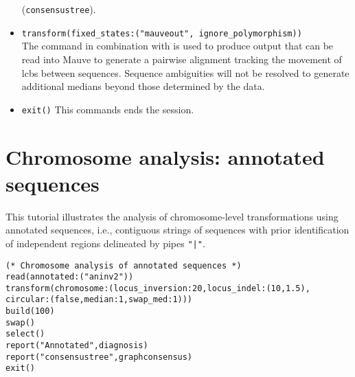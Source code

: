 \begin{itemize}
(\texttt{consensustree}). 
\item \texttt{transform(fixed\_states:("mauveout", ignore\_polymorphism))}  \\The {} command 
in combination with  is used to produce output that 
can be read into Mauve to generate a pairwise alignment tracking the movement of lcbs between sequences. 
Sequence ambiguities will not be resolved to generate additional medians beyond those determined by the data.
\item \texttt{exit()} This commands ends the \poy session.
\end{itemize}


\section{Chromosome analysis: annotated sequences}{\label{tutorial9}}

This tutorial illustrates the analysis of chromosome-level transformations using 
annotated sequences, i.e., contiguous strings of sequences with prior 
identification of independent regions delineated by pipes  \texttt{"|"}. 

\begin{verbatim}
(* Chromosome analysis of annotated sequences *)
read(annotated:("aninv2"))
transform(chromosome:(locus_inversion:20,locus_indel:(10,1.5),
circular:(false,median:1,swap_med:1)))
build(100)
swap()
select()
report("Annotated",diagnosis)
report("consensustree",graphconsensus)
exit()
\end{verbatim}

